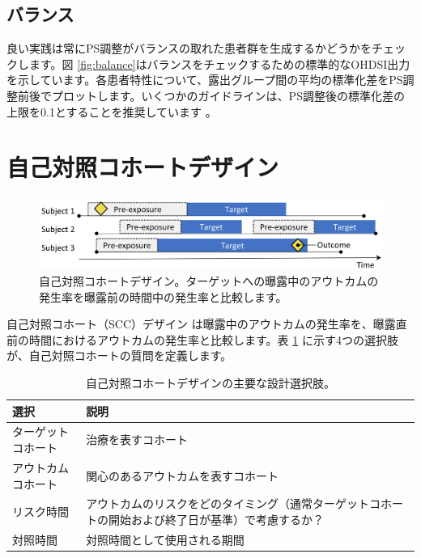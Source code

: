 \documentclass[
  11pt]{book}
\theoremstyle{definition}
\theoremstyle{definition}
\theoremstyle{definition}
\theoremstyle{definition}
\theoremstyle{remark}
\begin{document}
\subsection{バランス}\label{ux30d0ux30e9ux30f3ux30b9}

 

良い実践は常にPS調整がバランスの取れた患者群を生成するかどうかをチェックします。図 \ref{fig:balance}はバランスをチェックするための標準的なOHDSI出力を示しています。各患者特性について、露出グループ間の平均の標準化差をPS調整前後でプロットします。いくつかのガイドラインは、PS調整後の標準化差の上限を0.1とすることを推奨しています \citep{rubin_2001}。

\section{自己対照コホートデザイン}\label{ux81eaux5df1ux5bfeux7167ux30b3ux30dbux30fcux30c8ux30c7ux30b6ux30a4ux30f3}


\begin{figure}[h]

{\centering \includegraphics[width=0.9\linewidth]{images/PopulationLevelEstimation/selfControlledCohort} 

}

\caption{自己対照コホートデザイン。ターゲットへの曝露中のアウトカムの発生率を曝露前の時間中の発生率と比較します。}\label{fig:scc}
\end{figure}

自己対照コホート（SCC）デザイン \citep{ryan_2013} は曝露中のアウトカムの発生率を、曝露直前の時間におけるアウトカムの発生率と比較します。表 \ref{tab:sccChoices} に示す4つの選択肢が、自己対照コホートの質問を定義します。  

\begin{table}
\centering
\caption{\label{tab:sccChoices}自己対照コホートデザインの主要な設計選択肢。}
\centering
\begin{tabular}[t]{l>{\raggedright\arraybackslash}p{9cm}}
\toprule
選択 & 説明\\
\midrule
ターゲットコホート & 治療を表すコホート\\
アウトカムコホート & 関心のあるアウトカムを表すコホート\\
リスク時間 & アウトカムのリスクをどのタイミング（通常ターゲットコホートの開始および終了日が基準）で考慮するか？\\
対照時間 & 対照時間として使用される期間\\
\bottomrule
\end{tabular}
\end{table}
\end{document}
